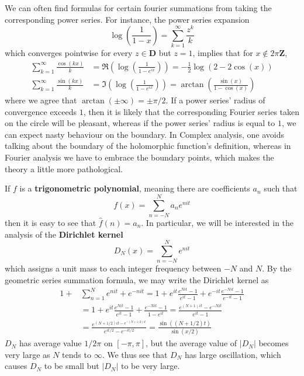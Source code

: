 \begin{example}
    We can often find formulas for certain fourier summations from taking the corresponding power series. For instance, the power series expansion
    \[ \log \left( \frac{1}{1-x} \right) = \sum_{k = 1}^\infty \frac{z^k}{k} \]
    which converges pointwise for every $z \in \mathbf{D}$ but $z = 1$, implies that for $x \not \in 2 \pi \mathbf{Z}$,
    \begin{align*}
        \sum_{k = 1}^\infty \frac{\cos(kx)}{k} &= \Re \left( \log \left( \frac{1}{1 - e^{ix}} \right) \right) = -\frac{1}{2} \log(2 - 2\cos(x))\\
        \sum_{k = 1}^\infty \frac{\sin(kx)}{k} &= \Im \left( \log \left( \frac{1}{1 - e^{ix}} \right) \right) = \arctan \left( \frac{\sin(x)}{1 - \cos(x)} \right)
    \end{align*}
    where we agree that $\arctan(\pm \infty) = \pm \pi/2$. If a power series' radius of convergence exceeds $1$, then it is likely that the corresponding Fourier series taken on the circle will be pleasant, whereas if the power series' radius is equal to $1$, we can expect nasty behaviour on the boundary. In Complex analysis, one avoids talking about the boundary of the holomorphic function's definition, whereas in Fourier analysis we have to embrace the boundary points, which makes the theory a little more pathological.
\end{example}

\begin{example}
    If $f$ is a {\bf trigonometric polynomial}, meaning there are coefficients $a_n$ such that
    \[  f(x) = \sum_{n = -N}^N a_n e^{nit} \]
    then it is easy to see that $\widehat{f}(n) = a_n$. In particular, we will be interested in the analysis of the {\bf Dirichlet kernel}
    \[ D_N(x) = \sum_{n = -N}^N e^{nit} \]
    which assigns a unit mass to each integer frequency between $-N$ and $N$. By the geometric series summation formula, we may write the Dirichlet kernel as
    \begin{align*}
        1 + &\sum_{n = 1}^N e^{nit} + e^{-nit} = 1 + e^{it} \frac{e^{Nit} - 1}{e^{it} - 1} + e^{-it} \frac{e^{-Nit} - 1}{e^{-it} - 1}\\
        &= 1 + e^{it} \frac{e^{Nit} - 1}{e^{it} - 1} + \frac{e^{-Nit} - 1}{1 - e^{it}} = \frac{e^{(N+1)it} - e^{-Nit}}{e^{it} - 1}\\
        &= \frac{e^{(N+1/2)it - e^{-(N+1/2)it}}}{e^{it/2} - e^{-it/2}} = \frac{\sin((N + 1/2)t)}{\sin(x/2)}
    \end{align*}
    $D_N$ has average value $1/2\pi$ on $[-\pi,\pi]$, but the average value of $|D_N|$ becomes very large as $N$ tends to $\infty$. We thus see that $D_N$ has large oscillation, which causes $D_N$ to be small but $|D_N|$ to be very large.
\end{example}

